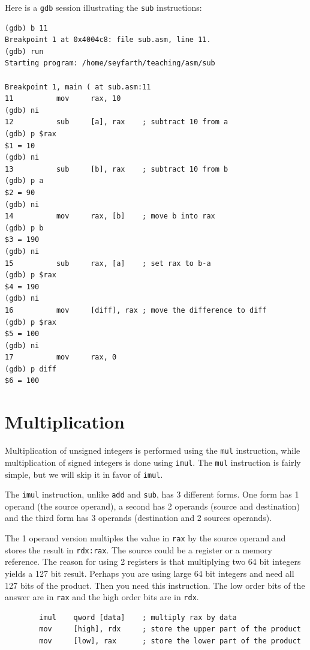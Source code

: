 \documentclass[11pt,b5paper]{book}
\begin{document}
Here is a {\tt gdb} session illustrating the {\tt sub} instructions: 
\begin{verbatim}
(gdb) b 11
Breakpoint 1 at 0x4004c8: file sub.asm, line 11.
(gdb) run
Starting program: /home/seyfarth/teaching/asm/sub 

Breakpoint 1, main ( at sub.asm:11
11          mov     rax, 10
(gdb) ni
12          sub     [a], rax    ; subtract 10 from a
(gdb) p $rax
$1 = 10
(gdb) ni
13          sub     [b], rax    ; subtract 10 from b
(gdb) p a
$2 = 90
(gdb) ni
14          mov     rax, [b]    ; move b into rax
(gdb) p b
$3 = 190
(gdb) ni
15          sub     rax, [a]    ; set rax to b-a
(gdb) p $rax
$4 = 190
(gdb) ni
16          mov     [diff], rax ; move the difference to diff
(gdb) p $rax
$5 = 100
(gdb) ni
17          mov     rax, 0
(gdb) p diff
$6 = 100
\end{verbatim}

\section{Multiplication}

Multiplication of unsigned integers is performed using the {\tt mul}  
instruction, while multiplication of signed integers is done using {\tt imul}.
The {\tt mul} instruction is fairly simple, but we will skip it in favor of
{\tt imul}.

The {\tt imul} instruction, unlike {\tt add} and {\tt sub}, has 3 different
forms.
One form has 1 operand (the source operand), a second has 2 operands (source
and destination) and the third form has 3 operands (destination and 2 sources
operands).

The 1 operand version multiples the value in {\tt rax} by the source operand
and stores the result in {\tt rdx:rax}.
The source could be a register or a memory reference.
The reason for using 2 registers is that multiplying two 64 bit integers
yields a 127 bit result.
Perhaps you are using large 64 bit integers and need all 127 bits of the
product.
Then you need this instruction.
The low order bits of the answer are in {\tt rax} and the high order bits are
in {\tt rdx}.

\begin{verbatim}
        imul    qword [data]    ; multiply rax by data
        mov     [high], rdx     ; store the upper part of the product
        mov     [low], rax      ; store the lower part of the product
\end{verbatim}
\end{document}
